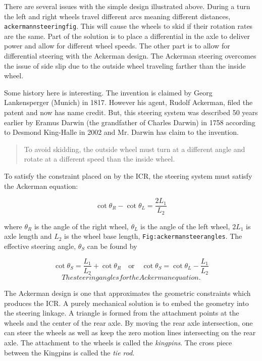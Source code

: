 There are several issues with the simple design illustrated above.
During a turn the left and right wheels travel different arcs meaning
different distances, \texttt{ackermannsteeringfig}. This will cause the
wheels to skid if their rotation rates are the same. Part of the
solution is to place a differential in the axle to deliver power and
allow for different wheel speeds. The other part is to allow for
differential steering with the Ackerman design. The Ackerman steering
overcomes the issue of side slip due to the outside wheel traveling
farther than the inside wheel.

Some history here is interesting. The invention is claimed by Georg
Lankensperger (Munich) in 1817. However his agent, Rudolf Ackerman,
filed the patent and now has name credit. But, this steering system was
described 50 years earlier by Eramus Darwin (the grandfather of Charles
Darwin) in 1758 according to Desmond King-Halle in 2002 and Mr. Darwin
has claim to the invention.

\begin{quote}
To avoid skidding, the outside wheel must turn at a different angle and
rotate at a different speed than the inside wheel.
\end{quote}

To satisfy the constraint placed on by the ICR, the steering system must
satisfy the Ackerman equation:

\[\cot\theta_R - \cot\theta_L = \frac{2L_1}{L_2}\]

where \(\theta_R\) is the angle of the right wheel, \(\theta_L\) is the
angle of the left wheel, \(2L_1\) is axle length and \(L_2\) is the
wheel base length, \texttt{Fig:ackermansteerangles}. The effective
steering angle, \(\theta_S\) can be found by

\[\cot\theta_S = \frac{L_1}{L_2} + \cot\theta_R    \quad {\mbox{or} } \quad \cot\theta_S =\cot\theta_L -  \frac{L_1}{L_2}\]\[The steering angles for the Ackerman
equation.\]

The Ackerman design is one that approximates the geometric constraints
which produces the ICR. A purely mechanical solution is to embed the
geometry into the steering linkage. A triangle is formed from the
attachment points at the wheels and the center of the rear axle. By
moving the rear axle intersection, one can steer the wheels as well as
keep the zero motion lines intersecting on the rear axle. The attachment
to the wheels is called the \emph{kingpins}. The cross piece between the
Kingpins is called the \emph{tie rod}.

